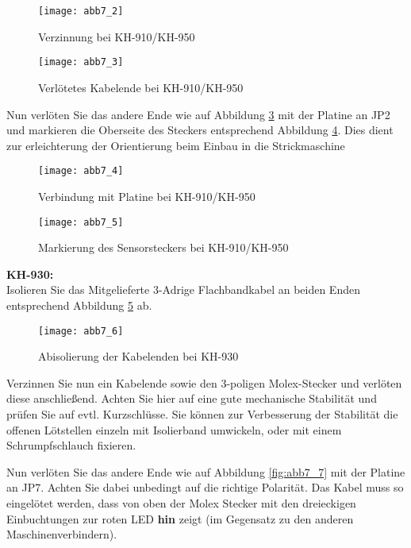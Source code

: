 \documentclass[fleqn,10pt]{SelfArx} %
\begin{document}
\begin{figure}[tbhp]\centering
\texttt{[image: abb7\_2]}
\caption{Verzinnung bei KH-910/KH-950}
\label{fig:abb7_2}
\end{figure}

\begin{figure}[tbhp]\centering
\texttt{[image: abb7\_3]}
\caption{Verlötetes Kabelende bei KH-910/KH-950}
\label{fig:abb7_3}
\end{figure}

Nun verlöten Sie das andere Ende wie auf Abbildung \ref{fig:abb7_4} mit der Platine an JP2 und markieren die Oberseite des Steckers entsprechend Abbildung \ref{fig:abb7_5}. Dies dient zur erleichterung der Orientierung beim Einbau in die Strickmaschine\par

\begin{figure}[tbhp]\centering
\texttt{[image: abb7\_4]}
\caption{Verbindung mit Platine bei KH-910/KH-950}
\label{fig:abb7_4}
\end{figure}

\begin{figure}[tbhp]\centering
\texttt{[image: abb7\_5]}
\caption{Markierung des Sensorsteckers bei KH-910/KH-950}
\label{fig:abb7_5}
\end{figure}

\FloatBarrier

\textbf{KH-930:} \\

Isolieren Sie das Mitgelieferte 3-Adrige Flachbandkabel an beiden Enden entsprechend Abbildung \ref{fig:abb7_6} ab.

\begin{figure}[tbhp]\centering
\texttt{[image: abb7\_6]}
\caption{Abisolierung der Kabelenden bei KH-930}
\label{fig:abb7_6}
\end{figure}

Verzinnen Sie nun ein Kabelende sowie den 3-poligen Molex-Stecker und verlöten diese anschließend. Achten Sie hier auf eine gute mechanische Stabilität und prüfen Sie auf evtl. Kurzschlüsse. Sie können zur Verbesserung der Stabilität die offenen Lötstellen einzeln mit Isolierband umwickeln, oder mit einem Schrumpfschlauch fixieren.

Nun verlöten Sie das andere Ende wie auf Abbildung \ref{fig:abb7_7} mit der Platine an JP7. Achten Sie dabei unbedingt auf die richtige Polarität. Das Kabel muss so eingelötet werden, dass von oben der Molex Stecker mit den dreieckigen Einbuchtungen zur roten LED \textbf{hin} zeigt (im Gegensatz zu den anderen Maschinenverbindern).
\end{document}
